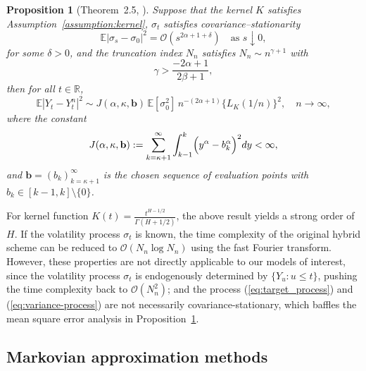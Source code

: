 \documentclass[11pt]{article}%
\newtheorem{proposition}{Proposition}
\theoremstyle{definition}
\begin{document}
\begin{proposition}[Theorem~2.5, \cite{bennedsen_2017_FS}]\label{prop:mse_orignial_hybrid}
Suppose that the kernel $K$ satisfies Assumption~\ref{assumption:kernel}, $\sigma_t$ satisfies covariance--stationarity
\[
    \mathbb{E}|\sigma_s-\sigma_0|^2=\mathcal{O}(s^{2\alpha+1+\delta}) \quad \text{as } s\downarrow 0,
\]
for some $\delta>0$, and the truncation index $N_n$ satisfies $N_n\sim n^{\gamma+1}$ with
\[
\gamma > \frac{-2\alpha+1}{2\beta+1},
\]
then for all $t\in\mathbb{R}$,
\[
\mathbb{E}|Y_t - Y^n_t|^2 \sim J(\alpha,\kappa,\mathbf{b})\,\mathbb{E}[\sigma_0^2]\,n^{-(2\alpha+1)}\{L_K(1/n)\}^2,\quad n\to\infty,
\]
where the constant
\[
J(\alpha,\kappa,\mathbf{b}) := \sum_{k=\kappa+1}^{\infty}\int_{k-1}^{k}\Bigl(y^\alpha - b_k^\alpha\Bigr)^2dy < \infty,
\]
and $\mathbf{b}=(b_k)_{k=\kappa+1}^\infty$ is the chosen sequence of evaluation points with $b_k\in[k-1,k]\setminus\{0\}$.
\end{proposition}

For kernel function \(K(t) = \tfrac{t^{H-1/2}}{\Gamma(H+1/2)}\), the above result yields a strong order of $H$. If the volatility process \(\sigma_t\) is known, the time complexity of the original hybrid scheme can be reduced to \(\mathcal{O}(N_n\log N_n)\) using the fast Fourier transform.
However, these properties are not directly applicable to our models of interest, since the volatility process $\sigma_t$ is endogenously determined by \(\{Y_{u}: u \le t\}\), pushing the time complexity back to \(\mathcal{O}(N_n^2)\); and the process (\ref{eq:target_process}) and (\ref{eq:variance-process}) are not necessarily covariance-stationary, which baffles the mean square error analysis in Proposition~\ref{prop:mse_orignial_hybrid}.

\subsection{Markovian approximation methods}
\end{document}
